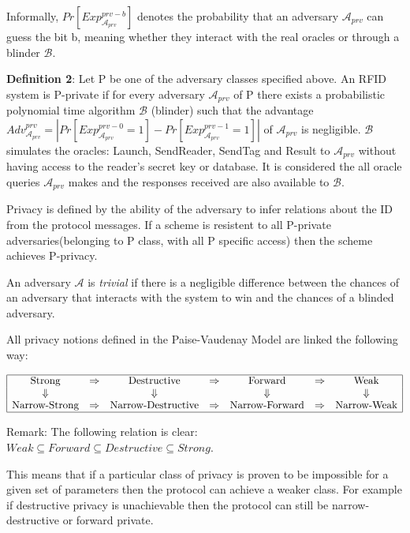     Informally, $Pr[Exp_{\mathcal{A}_{prv}}^{prv-b}]$ denotes the probability that an adversary $\mathcal{A}_{prv}$
    can guess the bit b, meaning whether they interact with the real oracles or through a blinder $\mathcal{B}$.

    \textbf{Definition 2}: Let P be one of the adversary classes specified above. An RFID system is P-private if for
    every adversary $\mathcal{A}_{prv}$ of P there exists a probabilistic polynomial time algorithm $\mathcal{B}$ 
    (blinder) such that the advantage $Adv_{\mathcal{A}_{prv}}^{prv} = | Pr[Exp_{\mathcal{A}_{prv}}^{prv-0} = 1] - Pr[Exp_{\mathcal{A}_{prv}}^{prv-1} = 1] |$ 
    of $\mathcal{A}_{prv}$ is negligible. $\mathcal{B}$ simulates the oracles: Launch, SendReader, SendTag and
    Result to $\mathcal{A}_{prv}$ without having access to the reader's secret key or database. It is considered the all
    oracle queries $\mathcal{A}_{prv}$ makes and the responses received are also available to $\mathcal{B}$.

    Privacy is defined by the ability of the adversary to infer relations about the ID from the protocol
    messages. If a scheme is resistent to all P-private adversaries(belonging to P class, with all
    P specific access) then the scheme achieves P-privacy.

    An adversary $\mathcal{A}$ is \textit{trivial} if there is a negligible difference between the chances
    of an adversary that interacts with the system to win and the chances of a blinded adversary.

    All privacy notions defined in the Paise-Vaudenay Model are linked the following way:

    \[
    \begin{array}{|ccccccc|}
        \hline
        \text{Strong} & \Rightarrow & \text{Destructive} & \Rightarrow & \text{Forward} & \Rightarrow & \text{Weak} \\
        \Downarrow & &  \Downarrow  & &\Downarrow  & & \Downarrow \\
        \text{Narrow-Strong} & \Rightarrow & \text{Narrow-Destructive} & \Rightarrow & \text{Narrow-Forward} & \Rightarrow & \text{Narrow-Weak} \\
        \hline
    \end{array}
    \]

    Remark: The following relation is clear: $Weak \subseteq Forward \subseteq Destructive \subseteq Strong$.

    This means that if a particular class of privacy is proven to be impossible for a given set of parameters then the protocol can achieve 
    a weaker class. For example if destructive privacy is unachievable then the protocol can still be narrow-destructive or forward private.
